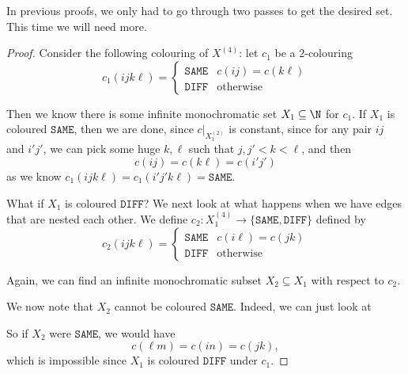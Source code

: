 \documentclass[a4paper]{article}
\begin{document}
In previous proofs, we only had to go through two passes to get the desired set. This time we will need more.
\begin{proof}
  Consider the following colouring of $X^{(4)}$: let $c_1$ be a $2$-colouring
  \[
    c_1(ijk\ell) =
    \begin{cases}
      \mathtt{SAME} & c(ij) = c(k\ell)\\
      \mathtt{DIFF} & \mathrm{otherwise}
    \end{cases}
  \]
  \begin{center}
  \end{center}
  Then we know there is some infinite monochromatic set $X_1 \subseteq \N$ for $c_1$. If $X_1$ is coloured $\mathtt{SAME}$, then we are done, since $c|_{X_1^{(2)}}$ is constant, since for any pair $ij$ and $i'j'$, we can pick some huge $k, \ell$ such that $j, j' < k < \ell$, and then
  \[
    c(ij) = c(k\ell) = c(i'j')
  \]
  as we know $c_1(ijk\ell) = c_1(i'j'k\ell) = \mathtt{SAME}$.

  What if $X_1$ is coloured $\mathtt{DIFF}$? We next look at what happens when we have edges that are nested each other. We define $c_2: X_1^{(4)} \to \{\mathtt{SAME}, \mathtt{DIFF}\}$ defined by
  \[
    c_2(ijk\ell) =
    \begin{cases}
      \mathtt{SAME} & c(i\ell) = c(jk)\\
      \mathtt{DIFF} & \mathrm{otherwise}
    \end{cases}
  \]
  \begin{center}
  \end{center}
  Again, we can find an infinite monochromatic subset $X_2 \subseteq X_1$ with respect to $c_2$.

  We now note that $X_2$ cannot be coloured $\mathtt{SAME}$. Indeed, we can just look at
  \begin{center}
  \end{center}
  So if $X_2$ were $\mathtt{SAME}$, we would have
  \[
    c(\ell m) = c(in) = c(jk),
  \]
  which is impossible since $X_1$ is coloured $\mathtt{DIFF}$ under $c_1$.


\end{proof}
\end{document}

